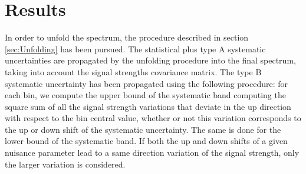 \section{Results}
\label{sec:Results}

In order to unfold the spectrum, the procedure described in section \ref{sec:Unfolding} has been pursued.
The statistical plus type A systematic uncertainties are propagated by the unfolding procedure into the final spectrum, taking into account the signal strengths covariance matrix. The type B systematic uncertainty has been propagated using the following procedure: for each \pth bin, we compute the upper bound of the systematic band computing the square sum of all the signal strength variations that deviate in the up direction with respect to the bin central value, whether or not this variation corresponds to the up or down shift of the systematic uncertainty. The same is done for the lower bound of the systematic band. If both the up and down shifts of a given nuisance parameter lead to a same direction variation of the signal strength, only the larger variation is considered.

